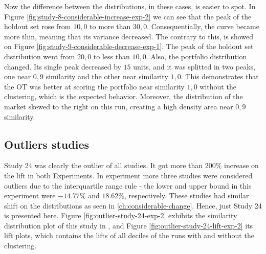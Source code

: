 Now the difference between the distributions, in these cases, is easier to spot. In Figure \ref{fig:study-8-considerable-increase-exp-2} we can see that the peak of the holdout set rose from $10,0$ to more than $30,0$. Consequentially, the curve became more thin, meaning that its variance decreased. The contrary to this, is showed on Figure \ref{fig:study-9-considerable-decrease-exp-1}. The peak of the holdout set distribution went from $20,0$ to less than $10,0$. Also, the portfolio distribution changed. Its single peak decreased by $15$ units, and it was splitted in two peaks, one near $0,9$ similarity and the other near similarity $1,0$. This demonstrates that the OT was better at scoring the portfolio near similarity $1,0$ without the clustering, which is the expected behavior. Moreover, the distribution of the market skewed to the right on this run, creating a high density area near $0,9$ similarity. 

\subsection{Outliers studies}
\label{ch:outliers}

Study 24 was clearly the outlier of all studies. It got more than $200\%$ increase on the lift in both Experiments. In experiment \nameExperimentII{} more three studies were considered outliers due to the interquartile range rule - the lower and upper bound in this experiment were $-14.77\%$ and $18.62\%$, respectively. These studies had similar shift on the distributions as seen in \ref{ch:considerable-change}. Hence, just Study 24 is presented here. Figure \ref{fig:outlier-study-24-exp-2} exhibits the similarity distribution plot of this study in \nameExperimentII{}, and Figure \ref{fig:outlier-study-24-lift-exp-2} its lift plots, which contains the lifts of all deciles of the runs with and without the clustering.

